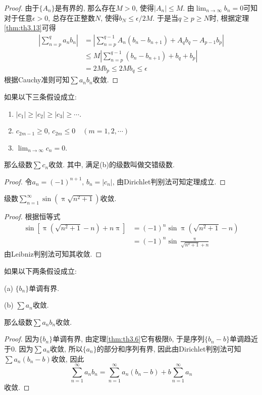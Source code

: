 \documentclass[cn,12pt,math=mtpro2,citestyle=gb7714-2015,bibstyle=gb7714-2015,twocol]{elegantbook}
\newcommand{\limn }{\lim_{n\to\infty}}
\begin{document}
\begin{proof}
  由于$\{A_n\}$是有界的, 那么存在$M>0$, 使得$|A_n|\leq M$. 由$\displaystyle\limn b_n=0$可知对于任意$\epsilon>0$, 总存在正整数$N$, 使得$\displaystyle b_N\leq \epsilon/2M$. 于是当$q\geq p\geq N$时, 根据定理\ref{thm:th3.13}可得
  \begin{align*}
  \left|\sum_{n=p}^{q}a_nb_n\right|&=\left|\sum_{n=p}^{q-1}A_n(b_n-b_{n+1})+A_qb_q-A_{p-1}b_p\right|\\
  &\leq M\left|\sum_{n=p}^{q-1}(b_n-b_{n+1})+b_q+b_p\right| \\
  &=2Mb_p\leq 2Mb_q\leq\epsilon
  \end{align*}
  根据Cauchy准则可知$\sum a_nb_n$收敛.
\end{proof}
\begin{corollary}[Leibniz判别法]
  如果以下三条假设成立:
  \begin{enumerate}[label=(\arabic*)]
  \item $|c_1|\geq |c_2|\geq |c_3|\geq\cdots$.

  \item $c_{2m-1}\geq0$, $c_{2m}\leq0\quad (m=1,2,\cdots)$

  \item $\limn c_n=0$.
  \end{enumerate}
  那么级数$\sum c_n$收敛. 其中, 满足(b)的级数叫做交错级数.
\end{corollary}
\begin{proof}
  令$a_n=(-1)^{n+1}$, $b_n=|c_n|$, 由Dirichlet判别法可知定理成立.
\end{proof}
\begin{example}
级数$\sum_{n=1}^{\infty}\sin\left(\uppi\sqrt{n^2+1}\right)$收敛.
\end{example}
\begin{proof}
  根据恒等式
  \begin{align*}
  \sin\left[\uppi\left(\sqrt{n^2+1}-n\right)+n\uppi\right]&=(-1)^n\sin\uppi\left(\sqrt{n^2+1}-n\right)\\&=(-1)^n\sin\frac{\uppi}{\sqrt{n^2+1}+n}
  \end{align*}
  由Leibniz判别法可知其收敛.
\end{proof}
\begin{theorem}[Abel判别法]
  如果以下两条假设成立:

  (a) $\{b_n\}$单调有界.

  (b) $\sum a_n$收敛.

  \noindent 那么级数$\sum a_nb_n$收敛.
\end{theorem}
\begin{proof}
  因为$\{b_n\}$单调有界, 由定理\ref{thm:th3.6}它有极限$b$, 于是序列$\{b_n-b\}$单调趋近于0. 因为$\sum a_n$收敛, 所以$\{a_n\}$的部分和序列有界, 因此由Dirichlet判别法可知
  $\sum a_n(b_n-b)$收敛, 因此
  $$\sum_{n=1}^{\infty}a_nb_n=\sum_{n=1}^{\infty}a_n(b_n-b)+b\sum_{n=1}^{\infty}a_n$$
  收敛.
\end{proof}
\end{document}
